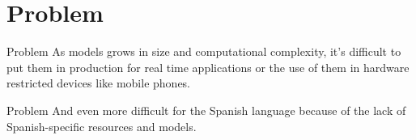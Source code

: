 \documentclass[aspectratio=169,xcolor=dvipsnames]{beamer}
\begin{document}





\section{Problem}
\begin{frame}{Problem}
\centering
\huge{As \alert{models grows} in size and computational complexity, it’s \alert{difficult} to put them in \alert{production} for real time applications or the use of them in hardware restricted devices like mobile phones.}
\end{frame}
\begin{frame}{Problem}
\centering
\huge{And even \alert{more difficult} for the \alert{Spanish} language because of the lack of Spanish-specific resources and models.}
\end{frame}







\end{document}
